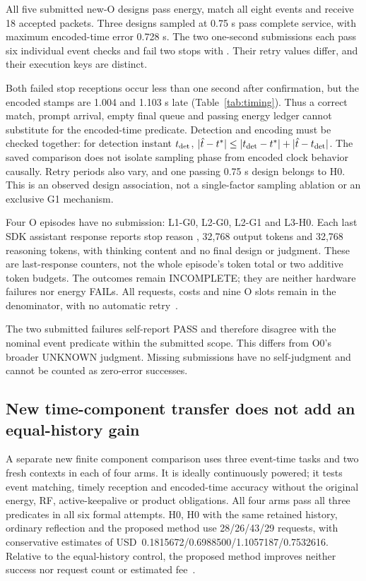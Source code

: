 


All five submitted new-O designs pass energy, match all eight events
and receive 18 accepted packets. Three designs sampled at 0.75 s
pass complete service, with maximum encoded-time error 0.728 s.
The two one-second submissions each pass six individual event
checks and fail two stops with . Their
retry values differ, and their execution keys are distinct.



Both failed stop receptions occur less than one second after
confirmation, but the encoded stamps are 1.004 and 1.103 s late
(Table~\ref{tab:timing}). Thus a correct match, prompt arrival,
empty final queue and passing energy ledger cannot substitute for
the encoded-time predicate. Detection and encoding must be checked
together: for detection instant $t_{\rm det}$,
$|\hat t-t^*|\leq|t_{\rm det}-t^*|+|\hat t-t_{\rm det}|$.
The saved comparison does not isolate sampling phase from encoded
clock behavior causally. Retry periods also vary, and one passing
0.75 s design belongs to H0. This is an observed design association,
not a single-factor sampling ablation or an exclusive G1 mechanism.

Four O episodes have no submission: L1-G0, L2-G0, L2-G1 and L3-H0.
Each last SDK assistant response reports stop reason ,
32,768 output tokens and 32,768 reasoning tokens, with thinking
content and no final design or judgment. These are last-response
counters, not the whole episode's token total or two additive token
budgets. The outcomes remain INCOMPLETE; they are neither hardware
failures nor energy FAILs. All requests, costs and nine O slots
remain in the denominator, with no automatic retry~\cite{final}.

The two submitted failures self-report PASS and therefore disagree
with the nominal event predicate within the submitted scope. This
differs from O0's broader UNKNOWN judgment. Missing submissions
have no self-judgment and cannot be counted as zero-error successes.

\subsection{New time-component transfer does not add an equal-history gain}
A separate new finite component comparison uses three event-time tasks and
two fresh contexts in each of four arms. It is ideally continuously powered;
it tests event matching, timely reception and encoded-time accuracy without
the original energy, RF, active-keepalive or product obligations. All four
arms pass all three predicates in all six formal attempts. H0, H0 with the
same retained history, ordinary reflection and the proposed method use
28/26/43/29 requests, with conservative estimates of
USD~0.1815672/0.6988500/1.1057187/0.7532616. Relative to the equal-history
control, the proposed method improves neither success nor request count or
estimated fee~\cite{abcc,abcreview}.

